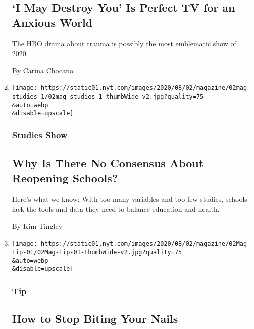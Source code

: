 \begin{enumerate}
  \hypertarget{i-may-destroy-you-is-perfect-tv-for-an-anxious-world}{%
  \subsection{`I May Destroy You' Is Perfect TV for an Anxious
  World}\label{i-may-destroy-you-is-perfect-tv-for-an-anxious-world}}

  The HBO drama about trauma is possibly the most emblematic show of
  2020.

  By Carina Chocano
\item
  \href{/2020/07/29/magazine/schools-reopening-covid.html}{}

  \texttt{[image: https://static01.nyt.com/images/2020/08/02/magazine/02mag-studies-1/02mag-studies-1-thumbWide-v2.jpg?quality=75\\\&auto=webp\\\&disable=upscale]}

  \hypertarget{studies-show}{%
  \subsubsection{Studies Show}\label{studies-show}}

  \hypertarget{why-is-there-no-consensus-about-reopening-schools}{%
  \subsection{Why Is There No Consensus About Reopening
  Schools?}\label{why-is-there-no-consensus-about-reopening-schools}}

  Here's what we know: With too many variables and too few studies,
  schools lack the tools and data they need to balance education and
  health.

  By Kim Tingley
\item
  \href{/2020/07/28/magazine/how-to-stop-biting-your-nails.html}{}

  \texttt{[image: https://static01.nyt.com/images/2020/08/02/magazine/02Mag-Tip-01/02Mag-Tip-01-thumbWide-v2.jpg?quality=75\\\&auto=webp\\\&disable=upscale]}

  \hypertarget{tip-}{%
  \subsubsection{Tip }\label{tip-}}

  \hypertarget{how-to-stop-biting-your-nails}{%
  \subsection{How to Stop Biting Your
  Nails}\label{how-to-stop-biting-your-nails}}


\end{enumerate}
